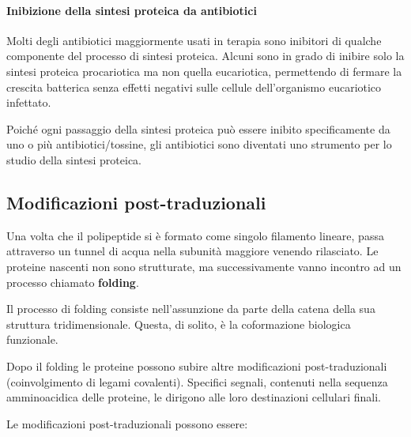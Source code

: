 \documentclass[11pt]{book}
\begin{document}
\paragraph{Inibizione della sintesi proteica da
antibiotici}\label{inibizione-della-sintesi-proteica-da-antibiotici}

Molti degli antibiotici maggiormente usati in terapia sono inibitori di
qualche componente del processo di sintesi proteica. Alcuni sono in
grado di inibire solo la sintesi proteica procariotica ma non quella
eucariotica, permettendo di fermare la crescita batterica senza effetti
negativi sulle cellule dell'organismo eucariotico infettato.

Poiché ogni passaggio della sintesi proteica può essere inibito
specificamente da uno o più antibiotici/tossine, gli antibiotici sono
diventati uno strumento per lo studio della sintesi proteica.

\subsection{Modificazioni
post-traduzionali}\label{modificazioni-post-traduzionali}

Una volta che il polipeptide si è formato come singolo filamento
lineare, passa attraverso un tunnel di acqua nella subunità maggiore
venendo rilasciato. Le proteine nascenti non sono strutturate, ma
successivamente vanno incontro ad un processo chiamato \textbf{folding}.

Il processo di folding consiste nell'assunzione da parte della catena
della sua struttura tridimensionale. Questa, di solito, è la
coformazione biologica funzionale.

Dopo il folding le proteine possono subire altre modificazioni
post-traduzionali (coinvolgimento di legami covalenti). Specifici
segnali, contenuti nella sequenza amminoacidica delle proteine, le
dirigono alle loro destinazioni cellulari finali.

Le modificazioni post-traduzionali possono essere:
\end{document}
